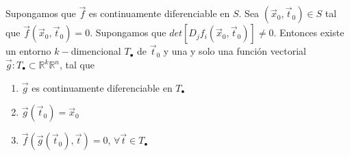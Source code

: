 \documentclass[12pt]{article}
\begin{document}
	Supongamos que $\vec{f}$ es continuamente diferenciable en $S$. Sea $(\vec{x}_0, \vec{t}_0)\in S$ tal que $\vec{f}(\vec{x}_0, \vec{t}_0)=0$. Supongamos que $det[D_jf_i(\vec{x}_0, \vec{t}_0)]\neq 0$. Entonces existe un entorno $k-$dimencional $T_\bullet$ de $\vec{t}_0$ y una y solo una función vectorial $\vec{g}: T_\bullet \subset\mathbb{R}^k\mathbb{R}^n$, tal que
	\begin{enumerate}
	\item $\vec{g}$ es continuamente diferenciable en $T_\bullet$
	\item $\vec{g}(\vec{t}_0)=\vec{x}_0$
	\item $\vec{f}(\vec{g}(\vec{t}_0), \vec{t})=0$, $\forall \vec{t}\in T_\bullet$
	\end{enumerate}
	
\end{document}
